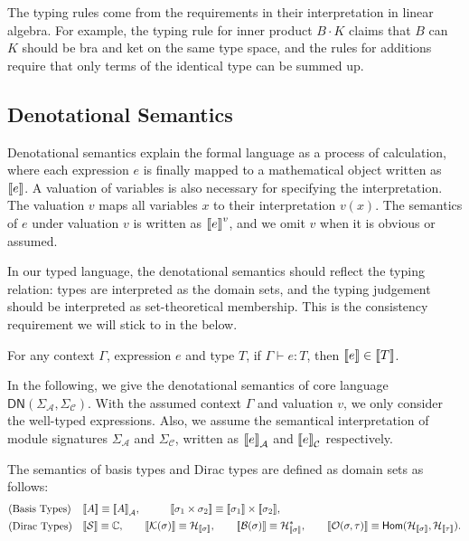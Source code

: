 The typing rules come from the requirements in their interpretation in linear algebra. For example, the typing rule for inner product $B\cdot K$ claims that $B$ can $K$ should be bra and ket on the same type space, and the rules for additions require that only terms of the identical type can be summed up.



\subsection{Denotational Semantics}

Denotational semantics explain the formal language as a process of calculation, where each expression $e$ is finally mapped to a mathematical object written as ${\llbracket e \rrbracket}$.
A valuation of variables is also necessary for specifying the interpretation. The valuation $v$ maps all variables $x$ to their interpretation $v(x)$. The semantics of $e$ under valuation $v$ is written as ${\llbracket e \rrbracket}^v$, and we omit $v$ when it is obvious or assumed.

In our typed language, the denotational semantics should reflect the typing relation: types are interpreted as the domain sets, and the typing judgement should be interpreted as set-theoretical membership. This is the consistency requirement we will stick to in the below.

\begin{definition}
  For any context $\Gamma$, expression $e$ and type $T$, if $\Gamma \vdash e : T$, then ${\llbracket e \rrbracket} \in {\llbracket T \rrbracket}$.
\end{definition}



In the following, we give the denotational semantics of core language $\textsf{DN}(\Sigma_\mathcal{A}, \Sigma_\mathcal{C})$. With the assumed context $\Gamma$ and valuation $v$, we only consider the well-typed expressions.
Also, we assume the semantical interpretation of module signatures $\Sigma_\mathcal{A}$ and $\Sigma_\mathcal{C}$, written as ${\llbracket e \rrbracket}_\mathcal{A}$ and ${\llbracket e \rrbracket}_\mathcal{C}$ respectively.


\begin{definition}
  The semantics of basis types and Dirac types are defined as domain sets as follows:
  \begin{align*}
    & \text{(Basis Types)} && \begin{aligned}
      & {\llbracket A \rrbracket} \equiv {\llbracket A \rrbracket}_\mathcal{A},
      \qquad
      && {\llbracket \sigma_1 \times \sigma_2 \rrbracket} \equiv {\llbracket \sigma_1 \rrbracket} \times {\llbracket \sigma_2 \rrbracket},
    \end{aligned} \\
    & \text{(Dirac Types)} && \begin{aligned}
      {\llbracket \mathcal{S}\rrbracket} \equiv \mathbb{C},
      \qquad
      {\llbracket \mathcal{K}(\sigma) \rrbracket} \equiv \mathcal{H}_{{\llbracket \sigma \rrbracket}}, 
      \qquad 
      {\llbracket \mathcal{B}(\sigma) \rrbracket} \equiv \mathcal{H}^*_{{\llbracket \sigma \rrbracket}},
      \qquad
      {\llbracket \mathcal{O}(\sigma, \tau) \rrbracket} \equiv \textsf{Hom}(\mathcal{H}_{\llbracket \sigma \rrbracket}, \mathcal{H}_{\llbracket \tau \rrbracket}).
    \end{aligned}
  \end{align*}
\end{definition}

